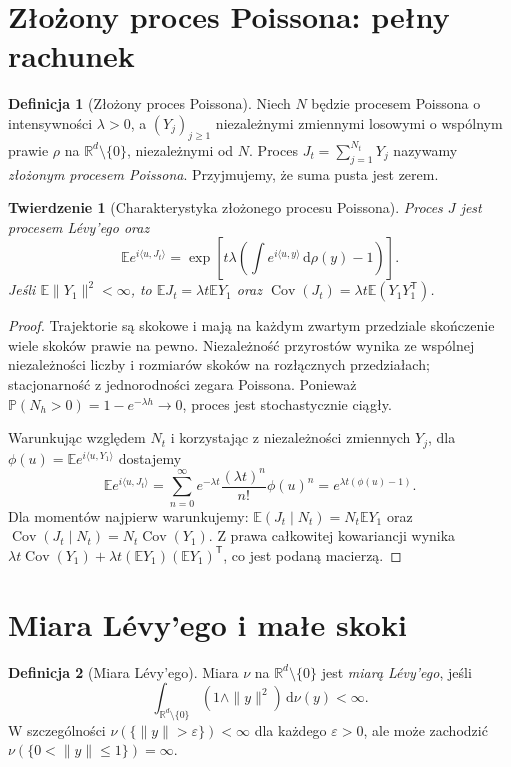 \documentclass[11pt,a4paper,oneside]{report}
\numberwithin{equation}{chapter}
\theoremstyle{plain}
\newtheorem{twierdzenie}{Twierdzenie}[chapter]
\theoremstyle{definition}
\newtheorem{definicja}{Definicja}[chapter]
\theoremstyle{remark}
\newcommand{\R}{\mathbb{R}}
\newcommand{\Prob}{\mathbb{P}}
\newcommand{\E}{\mathbb{E}}
\newcommand{\dd}{\mathrm{d}}
\begin{document}
\section{Złożony proces Poissona: pełny rachunek}

\begin{definicja}[Złożony proces Poissona]
Niech $N$ będzie procesem Poissona o intensywności
$\lambda>0$, a $(Y_j)_{j\ge1}$ niezależnymi zmiennymi
losowymi o wspólnym prawie $\rho$ na $\R^d\setminus\{0\}$,
niezależnymi od $N$. Proces
$J_t=\sum_{j=1}^{N_t}Y_j$ nazywamy \emph{złożonym
procesem Poissona}. Przyjmujemy, że suma pusta jest zerem.
\end{definicja}

\begin{twierdzenie}[Charakterystyka złożonego procesu Poissona]
\label{th:cpp}
Proces $J$ jest procesem Lévy'ego oraz
\[
\E e^{i\langle u,J_t\rangle}
=\exp\left[t\lambda\left(\int e^{i\langle u,y\rangle}
\,\dd\rho(y)-1\right)\right].
\]
Jeśli $\E\|Y_1\|^2<\infty$, to
$\E J_t=\lambda t\E Y_1$ oraz
$\operatorname{Cov}(J_t)=\lambda t\E(Y_1Y_1^{\mathsf T})$.
\end{twierdzenie}
\begin{proof}
Trajektorie są skokowe i mają na każdym zwartym przedziale
skończenie wiele skoków prawie na pewno.
Niezależność przyrostów wynika ze wspólnej niezależności
liczby i rozmiarów skoków na rozłącznych przedziałach;
stacjonarność z jednorodności zegara Poissona.
Ponieważ $\Prob(N_h>0)=1-e^{-\lambda h}\to0$,
proces jest stochastycznie ciągły.

Warunkując względem $N_t$ i korzystając z niezależności
zmiennych $Y_j$, dla
$\phi(u)=\E e^{i\langle u,Y_1\rangle}$ dostajemy
\[
\E e^{i\langle u,J_t\rangle}
=\sum_{n=0}^\infty e^{-\lambda t}
\frac{(\lambda t)^n}{n!}\phi(u)^n
=e^{\lambda t(\phi(u)-1)}.
\]
Dla momentów najpierw warunkujemy:
$\E(J_t\mid N_t)=N_t\E Y_1$ oraz
$\operatorname{Cov}(J_t\mid N_t)=N_t\operatorname{Cov}(Y_1)$.
Z prawa całkowitej kowariancji wynika
$\lambda t\operatorname{Cov}(Y_1)+
\lambda t(\E Y_1)(\E Y_1)^{\mathsf T}$,
co jest podaną macierzą.
\end{proof}

\section{Miara Lévy'ego i małe skoki}

\begin{definicja}[Miara Lévy'ego]
Miara $\nu$ na $\R^d\setminus\{0\}$ jest
\emph{miarą Lévy'ego}, jeśli
\[
\int_{\R^d\setminus\{0\}}(1\wedge\|y\|^2)\,\dd\nu(y)<\infty.
\tag{10.2}\label{eq:levy-measure}
\]
W szczególności $\nu(\{\|y\|>\varepsilon\})<\infty$
dla każdego $\varepsilon>0$, ale może zachodzić
$\nu(\{0<\|y\|\le1\})=\infty$.
\end{definicja}
\end{document}
